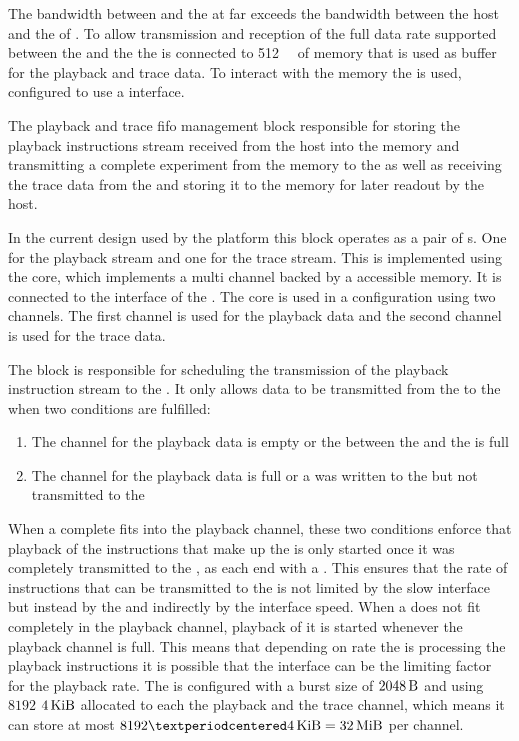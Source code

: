 The bandwidth between \FPGA{} and the \ASIC{} at \ASICBandwidth{} far exceeds the bandwidth between the host and the \FPGA{} of \HostBandwidth{}. To allow transmission and reception of the full data rate supported between the \FPGA{} and the \ASIC{} the \FPGA{} is connected to \SI{512}{\mebi\byte} of \DDR{} memory that is used as buffer for the playback and trace data. To interact with the \DDR{} memory the \XilinxMIG{} is used, configured to use a \AXI{} interface.

The playback and trace fifo management block responsible for storing the playback instructions stream received from the host into the \DDR{} memory and transmitting a complete experiment from the memory to the \pbexec{} as well as receiving the trace data from the \pbexec{} and storing it to the \DDR{} memory for later readout by the host.

In the current \FPGA{} design used by the \BSSTwo{} platform this block operates as a pair of \FIFO{}s. One for the playback stream and one for the trace stream. This \FIFO{} is implemented using the \Xilinx{} \VFIFO{} core, which implements a multi channel \FIFO{} backed by a \AXI{} accessible memory. It is connected to the \AXI{} interface of the \XilinxMIG{}. The \VFIFO{} core is used in a configuration using two channels. The first channel is used for the playback data and the second channel is used for the trace data.

The \pbmem{} block is responsible for scheduling the transmission of the playback instruction stream to the \pbexec{}.
It only allows data to be transmitted from the \VFIFO{} to the \pbexec{} when two conditions are fulfilled:
\begin{enumerate}
\item The \VFIFO{} channel for the playback data is empty or the \FIFO{} between the \VFIFO{} and the \pbexec{} is full
\item The \VFIFO{} channel for the playback data is full or a \haltInstr{} was written to the \VFIFO{} but not transmitted to the \pbexec{}
\end{enumerate}
When a complete \PlaybackProgram{} fits into the \VFIFO{} playback channel, these two conditions enforce that playback of the instructions that make up the \PlaybackProgram{} is only started once it was completely transmitted to the \VFIFO{}, as each \PlaybackProgram{} end with a \haltInstr{}. This ensures that the rate of instructions that can be transmitted to the \pbexec{} is not limited by the slow \HostARQ{} interface but instead by the \VFIFO{} and indirectly by the \XilinxMIG{} interface speed.
When a \PlaybackProgram{} does not fit completely in the \VFIFO{} playback channel, playback of it is started whenever the \VFIFO{} playback channel is full. This means that depending on rate the \pbexec{} is processing the playback instructions it is possible that the \HostARQ{} interface can be the limiting factor for the playback rate.
The \VFIFO{} is configured with a burst size of \(\SI{2048}{\byte}\) and using $\num{8192}$ $\SI{4}{\kibi\byte}$ allocated to each the playback and the trace channel, which means it can store at most \(\num{8192} · \SI{4}{\kibi\byte} = \SI{32}{\mebi\byte}\) per channel.

